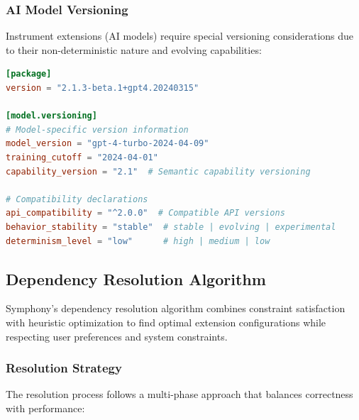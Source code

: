 \subsubsection{AI Model Versioning}
\label{subsubsec:ai-model-versioning}

Instrument extensions (AI models) require special versioning considerations due to their non-deterministic nature and evolving capabilities:

\begin{lstlisting}[language=toml,caption=AI Model Version Declaration]
[package]
version = "2.1.3-beta.1+gpt4.20240315"

[model.versioning]
# Model-specific version information
model_version = "gpt-4-turbo-2024-04-09"
training_cutoff = "2024-04-01"
capability_version = "2.1"  # Semantic capability versioning

# Compatibility declarations
api_compatibility = "^2.0.0"  # Compatible API versions
behavior_stability = "stable"  # stable | evolving | experimental
determinism_level = "low"      # high | medium | low
\end{lstlisting}

\subsection{Dependency Resolution Algorithm}
\label{subsec:dependency-resolution-algorithm}

Symphony's dependency resolution algorithm combines constraint satisfaction with heuristic optimization to find optimal extension configurations while respecting user preferences and system constraints.

\subsubsection{Resolution Strategy}
\label{subsubsec:resolution-strategy}

The resolution process follows a multi-phase approach that balances correctness with performance:

